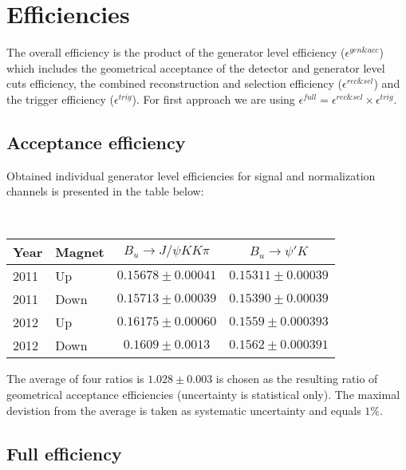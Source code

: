 \section{Efficiencies}

The overall efficiency is the product of the generator level efficiency ($\epsilon^{gen\&acc}$) which includes the geometrical acceptance of the detector and generator level cuts efficiency, the combined reconstruction and selection efficiency ($\epsilon^{rec\&sel}$) and the trigger efficiency ($\epsilon^{trig}$). For first approach we are using $\epsilon^{full} = \epsilon^{rec\&sel} \times \epsilon^{trig}$.


\subsection{Acceptance efficiency}
Obtained individual generator level efficiencies for signal and normalization channels is presented in the table below:


\vspace*{0.5cm}
\mbox{~}
\begin{tabular}{|l|l|c|c|}
\hline
Year & Magnet & $B_{u} \to J/\psi KK\pi$ & $B_{u} \to \psi' K$ \\
\hline
2011 & Up   & $0.15678 \pm 0.00041$ & $0.15311 \pm 0.00039$ \\
2011 & Down & $0.15713 \pm 0.00039$ & $0.15390 \pm 0.00039$ \\
2012 & Up   & $0.16175 \pm 0.00060$ & $0.1559  \pm 0.000393$ \\
2012 & Down & $0.1609  \pm 0.0013$  & $0.1562  \pm 0.000391$ \\
\hline
\end{tabular}
\vspace*{0.5cm}

The average of four ratios is $1.028 \pm 0.003$ is chosen as the resulting ratio of geometrical acceptance efficiencies (uncertainty is statistical only). The maximal devistion from the average is taken as systematic uncertainty and equals $1\%$.

\subsection{Full efficiency}